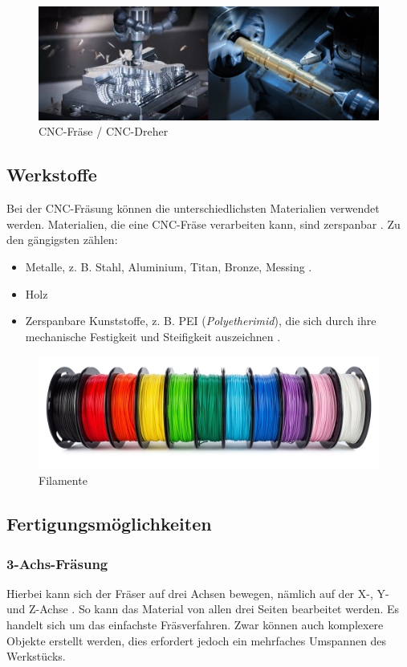 \begin{figure}[H]
	\centering
	\includegraphics[width=0.6\linewidth]{images/CNCDrehenFraesen.png}
	\caption[CNC-Fräse / CNC-Dreher]{CNC-Fräse / CNC-Dreher}
	\label{fig:CNC Drehen vs Fraesen}
\end{figure}


\subsection{Werkstoffe}
Bei der CNC-Fräsung können die unterschiedlichsten Materialien verwendet werden. Materialien, die eine CNC-Fräse verarbeiten kann, sind zerspanbar  \parencite{PEIZerspannung}. Zu den gängigsten zählen:

\begin{itemize}
	\item Metalle, z. B. Stahl, Aluminium, Titan, Bronze, Messing \parencite{CNCFraesen3}.
	\item Holz
	\item Zerspanbare Kunststoffe, z. B. PEI (\textit{Polyetherimid}), die sich durch ihre mechanische Festigkeit und Steifigkeit auszeichnen \parencite{PEIKunststoffPolyetherimid}.
\end{itemize}

\begin{figure}[H]
	\centering
	\includegraphics[width=0.5\linewidth]{images/Filamente.jpg}
	\caption[Filamente]{Filamente}
	\label{fig:Kunststoff Filamente}
\end{figure}


\subsection{Fertigungsmöglichkeiten}

\subsubsection{3-Achs-Fräsung}
Hierbei kann sich der Fräser auf drei Achsen bewegen, nämlich auf der X-, Y- und Z-Achse \parencite{Fraesen345Achs}. So kann das Material von allen drei Seiten bearbeitet werden. Es handelt sich um das einfachste Fräsverfahren. Zwar können auch komplexere Objekte erstellt werden, dies erfordert jedoch ein mehrfaches Umspannen des Werkstücks.

